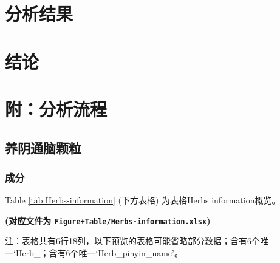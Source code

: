 \documentclass[
]{article}
\begin{document}
\hypertarget{results}{%
\section{分析结果}\label{results}}

\hypertarget{dis}{%
\section{结论}\label{dis}}

\hypertarget{workflow}{%
\section{附：分析流程}\label{workflow}}

\hypertarget{ux517bux9634ux901aux8111ux9897ux7c92}{%
\subsection{养阴通脑颗粒}\label{ux517bux9634ux901aux8111ux9897ux7c92}}

\hypertarget{ux6210ux5206}{%
\subsubsection{成分}\label{ux6210ux5206}}

Table \ref{tab:Herbs-information} (下方表格) 为表格Herbs information概览。

\textbf{(对应文件为 \texttt{Figure+Table/Herbs-information.xlsx})}

\begin{center}\begin{tcolorbox}[colback=gray!10, colframe=gray!50, width=0.9\linewidth, arc=1mm, boxrule=0.5pt]注：表格共有6行18列，以下预览的表格可能省略部分数据；含有6个唯一`Herb\_；含有6个唯一`Herb\_pinyin\_name'。
\end{tcolorbox}
\end{center}
\end{document}
